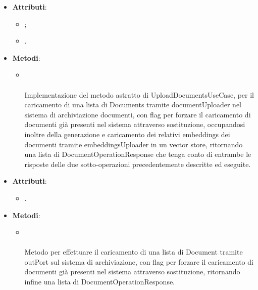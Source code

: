 \documentclass[10pt, a4paper]{article}
\begin{document}
\label{UploadDocumentsServiceDettaglio}
\begin{itemize}
    \item \textbf{Attributi}:
    \begin{itemize}
        \item {};
        \item {}.  
    \end{itemize}
    \item \textbf{Metodi}:
    \begin{itemize}
        \item {}\\ \\
        Implementazione del metodo astratto di UploadDocumentsUseCase, per il caricamento di una lista di Documents tramite documentUploader nel sistema di archiviazione documenti, con flag per forzare il caricamento di documenti già presenti nel sistema attraverso sostituzione, occupandosi inoltre della generazione e caricamento dei relativi embeddings dei documenti tramite embeddingsUploader in un vector store, ritornando una lista di DocumentOperationResponse che tenga conto di entrambe le risposte delle due sotto-operazioni precedentemente descritte ed eseguite.
    \end{itemize}
\end{itemize}

\label{DocumentUploaderDettaglio}
\begin{itemize}
    \item \textbf{Attributi}:
    \begin{itemize}
        \item {}.
    \end{itemize}
    \item \textbf{Metodi}:
    \begin{itemize}
        \item {}\\ \\ 
        Metodo per effettuare il caricamento di una lista di Document tramite outPort sul sistema di archiviazione, con flag per forzare il caricamento di documenti già presenti nel sistema attraverso sostituzione, ritornando infine una lista di DocumentOperationResponse.
    \end{itemize}
\end{itemize}
\end{document}
